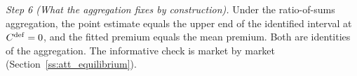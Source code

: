 \emph{Step 6 (What the aggregation fixes by construction).} Under the ratio-of-sums aggregation, the point estimate equals the upper end of the identified interval at $C^{\rm def}=0$, and the fitted premium equals the mean premium. Both are identities of the aggregation. The informative check is market by market (Section~\ref{ss:att_equilibrium}).
